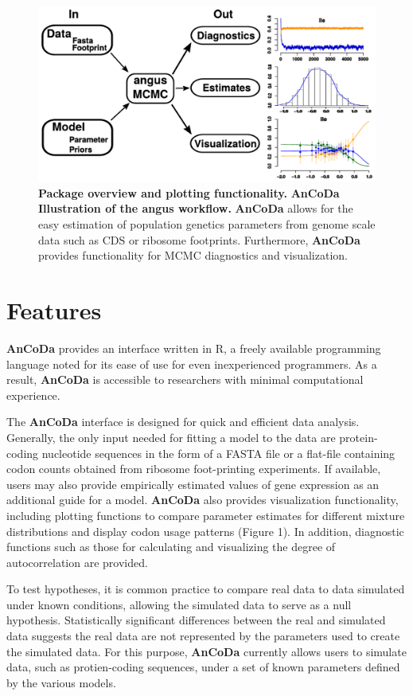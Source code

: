 \documentclass{bioinfo}
\newcommand{\package}{\textbf{AnCoDa }} %
\begin{document}
\begin{figure}[!tpb]
\centering
 \includegraphics[width=5in]{workflow_croped.pdf}
\vspace{-0.2cm}
\caption{\textbf{Package overview and plotting functionality.} \package \textbf{Illustration of the angus workflow.} 
\package allows for the easy estimation of population genetics parameters from genome scale data such as CDS or ribosome footprints. 
Furthermore, \package provides functionality for MCMC diagnostics and visualization. 
}
\label{fig:plotbin}
\end{figure}

\section*{Features}
\package provides an interface written in R, a freely available programming language noted for its ease of use for even inexperienced programmers. 
As a result, \package is accessible to researchers with minimal computational experience. 

The \package interface is designed for quick and efficient data analysis.
Generally, the only input needed for fitting a model to the data are protein-coding nucleotide sequences in the form of a FASTA file or a flat-file containing codon counts obtained from ribosome foot-printing experiments. 
If available, users may also provide empirically estimated values of gene expression as an additional guide for a model.
\package also provides visualization functionality, including plotting functions to compare parameter estimates for different mixture distributions and display codon usage patterns (Figure 1). In addition, diagnostic functions such as those for calculating and visualizing the degree of autocorrelation are provided.

To test hypotheses, it is common practice to compare real data to data simulated under known conditions, allowing the simulated data to serve as a null hypothesis. Statistically significant differences between the real and simulated data suggests the real data are not represented by the parameters used to create the simulated data. For this purpose, \package currently allows users to simulate data, such as protien-coding sequences, under a set of known parameters defined by the various models.
\end{document}
